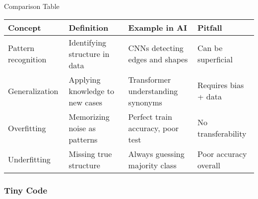 \documentclass[
  letterpaper,
  DIV=11,
  numbers=noendperiod]{scrreprt}
\begin{document}
Comparison Table

\begin{longtable}[]{@{}
  >{\raggedright\arraybackslash}p{}
  >{\raggedright\arraybackslash}p{}
  >{\raggedright\arraybackslash}p{}
  >{\raggedright\arraybackslash}p{}@{}}
\toprule\noalign{}
\begin{minipage}[b]{\linewidth}\raggedright
Concept
\end{minipage} & \begin{minipage}[b]{\linewidth}\raggedright
Definition
\end{minipage} & \begin{minipage}[b]{\linewidth}\raggedright
Example in AI
\end{minipage} & \begin{minipage}[b]{\linewidth}\raggedright
Pitfall
\end{minipage} \\
\midrule\noalign{}
\endhead
\bottomrule\noalign{}
\endlastfoot
Pattern recognition & Identifying structure in data & CNNs detecting
edges and shapes & Can be superficial \\
Generalization & Applying knowledge to new cases & Transformer
understanding synonyms & Requires bias + data \\
Overfitting & Memorizing noise as patterns & Perfect train accuracy,
poor test & No transferability \\
Underfitting & Missing true structure & Always guessing majority class &
Poor accuracy overall \\
\end{longtable}

\subsubsection{Tiny Code}\label{tiny-code-53}
\end{document}
